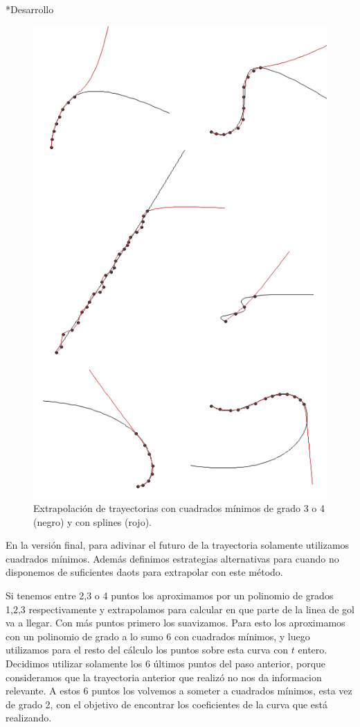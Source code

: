 \documentclass[12pt,titlepage]{article}
\newenvironment{usection}[1]{\newpage\begin{section}*{#1}	\addcontentsline{toc}{section}{#1}}{\end{section}}
\begin{document}
\begin{usection}{Desarrollo}
		\begin{figure}[H]
			\centering
			\includegraphics[scale=0.75]{img/extrap.png}
			\caption{
				Extrapolación de trayectorias con cuadrados mínimos de grado 3 o 4 (negro) y con splines (rojo).
			}
			\label{fig:extrap}
		\end{figure}

	
		En la versión final, para adivinar el futuro de la trayectoria solamente utilizamos cuadrados mínimos.
		Además definimos estrategias alternativas para cuando no disponemos de suficientes daots para extrapolar con este método.
	
		Si tenemos entre 2,3 o 4 puntos los aproximamos por un polinomio de grados 1,2,3 respectivamente y extrapolamos para calcular en que parte de la linea de gol va a llegar.
		Con más puntos primero los suavizamos. Para esto los aproximamos con un polinomio de grado a lo sumo 6 con cuadrados mínimos, y luego utilizamos para el resto del cálculo los puntos sobre esta curva con $t$ entero.
		Decidimos utilizar solamente los 6 últimos puntos del paso anterior, porque consideramos que la trayectoria anterior que realizó no nos da informacion relevante.
		A estos 6 puntos los volvemos a someter a cuadrados mínimos, esta vez de grado 2, con el objetivo de encontrar los coeficientes de la curva que está realizando.
	

\end{usection}
\end{document}
